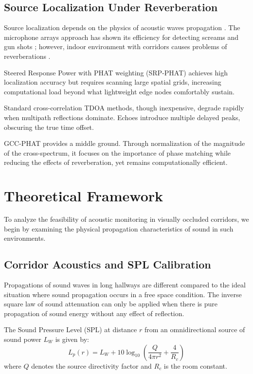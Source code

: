 \documentclass[conference]{IEEEtran}
\begin{document}
\subsection{Source Localization Under Reverberation}
Source localization depends on the physics of acoustic waves propagation \cite{b9}. The microphone arrays approach has shown its efficiency for detecting screams and gun shots \cite{b5}; however, indoor environment with corridors causes problems of reverberations \cite{b25}.

Steered Response Power with PHAT weighting (SRP-PHAT) \cite{b27} achieves high localization accuracy but requires scanning large spatial grids, increasing computational load beyond what lightweight edge nodes comfortably sustain.

Standard cross-correlation TDOA methods, though inexpensive, degrade rapidly when multipath reflections dominate. Echoes introduce multiple delayed peaks, obscuring the true time offset.

\cite{b20} GCC-PHAT provides a middle ground. Through normalization of the magnitude of the cross-spectrum, it focuses on the importance of phase matching while reducing the effects of reverberation, yet remains computationally efficient.

\section{Theoretical Framework}

To analyze the feasibility of acoustic monitoring in visually occluded corridors, we begin by examining the physical propagation characteristics of sound in such environments.

\subsection{Corridor Acoustics and SPL Calibration}
Propagations of sound waves in long hallways are different compared to the ideal situation where sound propagation occurs in a free space condition. The inverse square law of sound attenuation can only be applied when there is pure propagation of sound energy without any effect of reflection.

The Sound Pressure Level (SPL) at distance $r$ from an omnidirectional source of sound power $L_W$ is given by:
\begin{equation}
L_p(r) = L_W + 10 \log_{10}\left(\frac{Q}{4\pi r^2} + \frac{4}{R_c}\right)
\end{equation}
where $Q$ denotes the source directivity factor and $R_c$ is the room constant.
\end{document}
